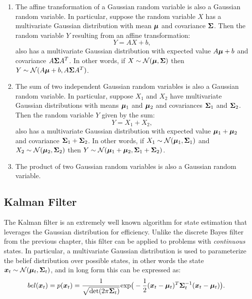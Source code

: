 \begin{enumerate}
    \item The affine transformation of a Gaussian random variable is also a Gaussian random variable. In particular, suppose the random variable $X$ has a multivariate Gaussian distribution with mean $\bm{\mu}$ and covariance $\bm{\Sigma}$. Then the random variable $Y$ resulting from an affine transformation:
    \begin{equation*}
        Y = AX + b,
    \end{equation*}
    also has a multivariate Gaussian distribution with expected value $A\bm{\mu} + b$ and covariance $A\bm{\Sigma} A^T$. In other words, if $X \sim \mathcal{N}(\bm{\mu}, \bm{\Sigma})$ then $Y \sim \mathcal{N}(A\bm{\mu}+b, A\bm{\Sigma} A^T)$.
    \item The sum of two independent Gaussian random variables is also a Gaussian random variable. In particular, suppose $X_1$ and $X_2$ have multivariate Gaussian distributions with means $\bm{\mu}_1$ and $\bm{\mu}_2$ and covariances $\bm{\Sigma}_1$ and $\bm{\Sigma}_2$. Then the random variable $Y$ given by the sum:
    \begin{equation*}
        Y = X_1 + X_2,
    \end{equation*}
    also has a multivariate Gaussian distribution with expected value $\bm{\mu}_1 + \bm{\mu}_2$ and covariance $\bm{\Sigma}_1 + \bm{\Sigma}_2$. In other words, if $X_1 \sim \mathcal{N}(\bm{\mu}_1, \bm{\Sigma}_1)$ and $X_2 \sim \mathcal{N}(\bm{\mu}_2, \bm{\Sigma}_2)$ then $Y \sim \mathcal{N}(\bm{\mu}_1 + \bm{\mu}_2, \bm{\Sigma}_1 + \bm{\Sigma}_2)$.
    \item The product of two Gaussian random variables is also a Gaussian random variable.
\end{enumerate}

\subsection{Kalman Filter}
The Kalman filter is an extremely well known algorithm for state estimation that leverages the Gaussian distribution for efficiency. Unlike the discrete Bayes filter from the previous chapter, this filter can be applied to problems with \textit{continuous} states.
In particular, a multivariate Gaussian distribution is used to parameterize the belief distribution over possible states, in other words the state $\bm{x}_t \sim \mathcal{N}(\bm{\mu}_t, \bm{\Sigma}_t)$, and in long form this can be expressed as:
\begin{equation*}
bel(\bm{x}_t) = p(\bm{x}_t) = \frac{1}{\sqrt{\text{det}(2\pi \bm{\Sigma}_t)}} \text{exp}\big( -\frac{1}{2}(\bm{x}_t-\bm{\mu}_t)^T \bm{\Sigma}_t^{-1} (\bm{x}_t-\bm{\mu}_t) \big).
\end{equation*}

